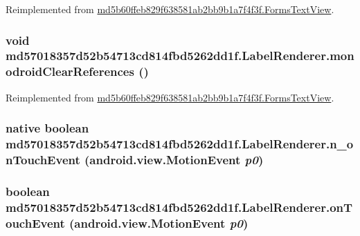 Reimplemented from \hyperlink{classmd5b60ffeb829f638581ab2bb9b1a7f4f3f_1_1_forms_text_view_20925dbf92ee998bfae5cc3aca483f3a}{md5b60ffeb829f638581ab2bb9b1a7f4f3f.FormsTextView}.\hypertarget{classmd57018357d52b54713cd814fbd5262dd1f_1_1_label_renderer_d17a308f68c51092a4967293f970fbaa}{
\subsubsection[{monodroidClearReferences}]{\setlength{\rightskip}{0pt plus 5cm}void md57018357d52b54713cd814fbd5262dd1f.LabelRenderer.monodroidClearReferences ()}}
\label{classmd57018357d52b54713cd814fbd5262dd1f_1_1_label_renderer_d17a308f68c51092a4967293f970fbaa}




Reimplemented from \hyperlink{classmd5b60ffeb829f638581ab2bb9b1a7f4f3f_1_1_forms_text_view_ae0338a9a14411e891317f37a37f4f58}{md5b60ffeb829f638581ab2bb9b1a7f4f3f.FormsTextView}.\hypertarget{classmd57018357d52b54713cd814fbd5262dd1f_1_1_label_renderer_30feb9b98a462c67f2a5295f8ab384cd}{
\subsubsection[{n\_\-onTouchEvent}]{\setlength{\rightskip}{0pt plus 5cm}native boolean md57018357d52b54713cd814fbd5262dd1f.LabelRenderer.n\_\-onTouchEvent (android.view.MotionEvent {\em p0})}}
\label{classmd57018357d52b54713cd814fbd5262dd1f_1_1_label_renderer_30feb9b98a462c67f2a5295f8ab384cd}


\hypertarget{classmd57018357d52b54713cd814fbd5262dd1f_1_1_label_renderer_29e4f37b703ed211f7df60679839d2bf}{
\subsubsection[{onTouchEvent}]{\setlength{\rightskip}{0pt plus 5cm}boolean md57018357d52b54713cd814fbd5262dd1f.LabelRenderer.onTouchEvent (android.view.MotionEvent {\em p0})}}
\label{classmd57018357d52b54713cd814fbd5262dd1f_1_1_label_renderer_29e4f37b703ed211f7df60679839d2bf}




